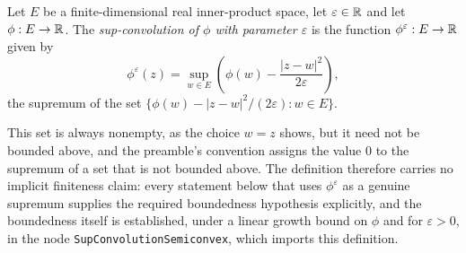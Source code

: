 \begin{definition}
Let $E$ be a finite-dimensional real inner-product space, let $\varepsilon\in\mathbb{R}$
and let $\phi:E\to\mathbb{R}$. The \emph{sup-convolution of $\phi$ with parameter
$\varepsilon$} is the function $\phi^\varepsilon:E\to\mathbb{R}$ given by
\[
  \phi^\varepsilon(z)
    =\sup_{w\in E}\left(\phi(w)-\frac{|z-w|^2}{2\varepsilon}\right),
\]
the supremum of the set
$\bigl\{\phi(w)-|z-w|^2/(2\varepsilon):w\in E\bigr\}$.

This set is always nonempty, as the choice $w=z$ shows, but it need not be
bounded above, and the preamble's convention assigns the value $0$ to the
supremum of a set that is not bounded above. The definition therefore carries no
implicit finiteness claim: every statement below that uses
$\phi^\varepsilon$ as a genuine supremum supplies the required boundedness
hypothesis explicitly, and the boundedness itself is established, under a
linear growth bound on $\phi$ and for $\varepsilon>0$, in the node
\texttt{SupConvolutionSemiconvex}, which imports this definition.
\end{definition}
